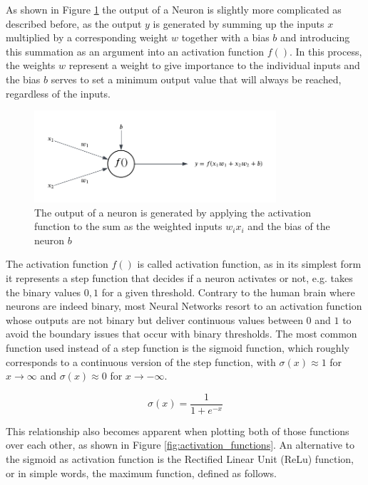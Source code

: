 As shown in Figure \ref{fig:neuron_calculations} the output of a Neuron is slightly more complicated as described before, as the output $y$ is generated by summing up the inputs $x$ multiplied by a corresponding weight $w$ together with a bias $b$ and introducing this summation as an argument into an activation function $f()$. In this process, the weights $w$ represent a weight to give importance to the individual inputs and the bias $b$ serves to set a minimum output value that will always be reached, regardless of the inputs. 

\begin{figure}[h] 
	\centering
	\includegraphics[width=0.8\textwidth]{figures/modelling/perceptron_concept.png} %
	\caption{The output of a neuron is generated by applying the activation function to the sum as the weighted inputs $w_ix_i$ and the bias of the neuron $b$}
	\label{fig:neuron_calculations}
\end{figure}

The activation function $f()$ is called activation function, as in its simplest form it represents a step function that decides if a neuron activates or not, e.g. takes the binary values ${0,1}$ for a given threshold. Contrary to the human brain where neurons are indeed binary, most Neural Networks resort to an activation function whose outputs are not binary but deliver continuous values between $0$ and $1$ to avoid the boundary issues that occur with binary thresholds. The most common function used instead of a step function is the sigmoid function, which roughly corresponds to a continuous version of the step function, with $\sigma(x) \approx 1$ for $x \to \infty$ and $\sigma(x) \approx 0$ for $x \to -\infty$.


\[
\sigma(x) = \frac{1}{1 + e^{-x}}
\]

This relationship also becomes apparent when plotting both of those functions over each other, as shown in Figure \ref{fig:activation_functions}. 
An alternative to the sigmoid as activation function is the Rectified Linear Unit (ReLu) function, or in simple words, the maximum function, defined as follows. 

